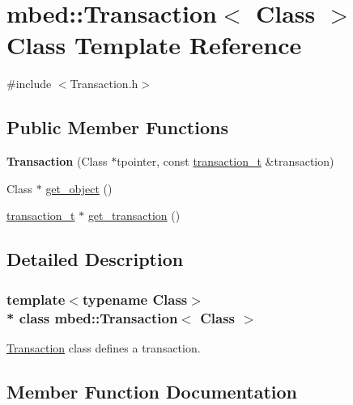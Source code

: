 \hypertarget{classmbed_1_1_transaction}{}\section{mbed\+:\+:Transaction$<$ Class $>$ Class Template Reference}
\label{classmbed_1_1_transaction}


{\ttfamily \#include $<$Transaction.\+h$>$}

\subsection*{Public Member Functions}
\begin{DoxyCompactItemize}
\item 
{\bfseries Transaction} (Class $\ast$tpointer, const \hyperlink{structmbed_1_1transaction__t}{transaction\+\_\+t} \&transaction)\hypertarget{classmbed_1_1_transaction_a8f185640162870544484447dddb655f3}{}\label{classmbed_1_1_transaction_a8f185640162870544484447dddb655f3}

\item 
Class $\ast$ \hyperlink{classmbed_1_1_transaction_a1cc189ffc187d991feada5305f895c94}{get\+\_\+object} ()
\item 
\hyperlink{structmbed_1_1transaction__t}{transaction\+\_\+t} $\ast$ \hyperlink{classmbed_1_1_transaction_a3f1bb2429fab5588c7127d640ea35236}{get\+\_\+transaction} ()
\end{DoxyCompactItemize}


\subsection{Detailed Description}
\subsubsection*{template$<$typename Class$>$\\*
class mbed\+::\+Transaction$<$ Class $>$}

\hyperlink{classmbed_1_1_transaction}{Transaction} class defines a transaction. 

\subsection{Member Function Documentation}
